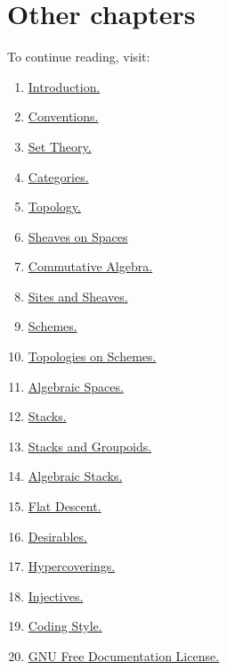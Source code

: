 \section{Other chapters}

\noindent
To continue reading, visit:
\begin{enumerate}
\item \hyperref[introduction-section-overview]{Introduction.}
\item \hyperref[conventions-section-comments]{Conventions.}
\item \hyperref[sets-section-introduction]{Set Theory.}
\item \hyperref[categories-section-introduction]{Categories.}
\item \hyperref[topology-section-introduction]{Topology.}
\item \hyperref[sheaves-section-introduction]{Sheaves on Spaces}
\item \hyperref[algebra-section-introduction]{Commutative Algebra.}
\item \hyperref[sites-section-introduction]{Sites and Sheaves.}
\item \hyperref[schemes-section-introduction]{Schemes.}
\item \hyperref[etale-section-introduction]{Topologies on Schemes.}
\item \hyperref[spaces-section-introduction]{Algebraic Spaces.}
\item \hyperref[stacks-section-introduction]{Stacks.}
\item \hyperref[stacks-groupoids-section-introduction]{Stacks and Groupoids.}
\item \hyperref[algebraic-section-introduction]{Algebraic Stacks.}
\item \hyperref[flat-section-introduction]{Flat Descent.}
\item \hyperref[desirables-section-introduction]{Desirables.}
\item \hyperref[hypercovering-section-introduction]{Hypercoverings.}
\item \hyperref[injectives-section-introduction]{Injectives.}
\item \hyperref[coding-section-style]{Coding Style.}
\item \hyperref[fdl-version]{GNU Free Documentation License.}
\end{enumerate}
